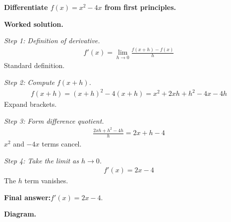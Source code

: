 \documentclass[11pt]{article}
\newcommand{\question}[1]{\par\medskip\noindent\textbf{#1}\par}
\begin{document}
\question{Differentiate \( f(x) = x^2 - 4x \) from first principles.}

\textbf{Worked solution.}

\textit{Step 1: Definition of derivative.}
\[\begin{gathered}
f'(x) = \lim_{h \to 0}\frac{f(x+h) - f(x)}{h}
\end{gathered}\]
Standard definition.

\textit{Step 2: Compute \( f(x+h) \).}
\[\begin{gathered}
f(x+h) = (x+h)^2 - 4(x+h) = x^2 + 2xh + h^2 - 4x - 4h
\end{gathered}\]
Expand brackets.

\textit{Step 3: Form difference quotient.}
\[\begin{gathered}
\frac{2xh + h^2 - 4h}{h} = 2x + h - 4
\end{gathered}\]
\( x^2 \) and \( -4x \) terms cancel.

\textit{Step 4: Take the limit as \( h \to 0 \).}
\[\begin{gathered}
f'(x) = 2x - 4
\end{gathered}\]
The \( h \) term vanishes.

\begin{answerbox}
\textbf{Final answer:}\quad \(\displaystyle  f'(x) = 2x - 4 \).
\end{answerbox}
\textbf{Diagram.}
\end{document}
